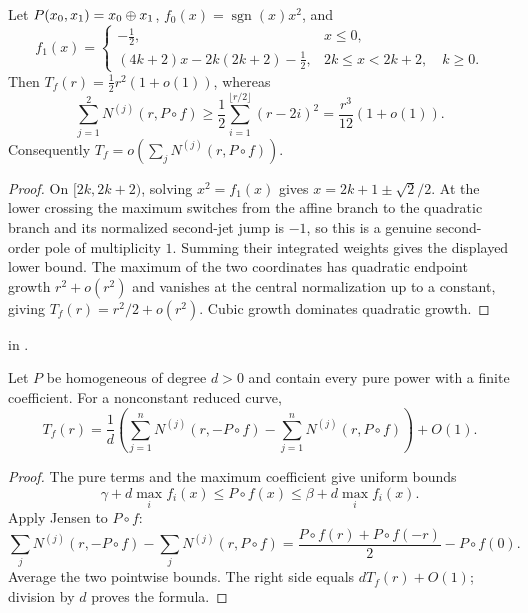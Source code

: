 \begin{example}
\leanok
{}
Let $P(x_0,x_1)=x_0\mathbin{\oplus} x_1$, $f_0(x)=\operatorname{sgn}(x)x^2$, and
\[
 f_1(x)=\begin{cases}
 -\frac12,&x\leq0,\\
 (4k+2)x-2k(2k+2)-\frac12,&2k\leq x<2k+2,\quad k\geq0.
 \end{cases}
\]
Then $T_f(r)=\frac12r^2(1+o(1))$, whereas
\[
 \sum_{j=1}^2N^{(j)}(r,P\circ f)\geq
 \frac12\sum_{i=1}^{\lfloor r/2\rfloor}(r-2i)^2
 =\frac{r^3}{12}(1+o(1)).
\]
Consequently $T_f=o(\sum_jN^{(j)}(r,P\circ f))$.
\end{example}

\begin{proof}
\leanok
On $[2k,2k+2)$, solving $x^2=f_1(x)$ gives
$x=2k+1\pm\sqrt2/2$.  At the lower crossing the maximum switches from the
affine branch to the quadratic branch and its normalized second-jet jump is
$-1$, so this is a genuine second-order pole of multiplicity $1$.  Summing
their integrated weights gives the displayed lower bound.  The maximum of
the two coordinates has quadratic endpoint growth $r^2+o(r^2)$ and vanishes
at the central normalization up to a constant, giving
$T_f(r)=r^2/2+o(r^2)$.  Cubic growth dominates quadratic growth.
\end{proof}

\begin{leanproof}
 in
.
\end{leanproof}

\begin{theorem}
\leanok
{}
Let $P$ be homogeneous of degree $d>0$ and contain every pure power with a
finite coefficient.  For a nonconstant reduced curve,
\[
 T_f(r)=\frac1d\left(
 \sum_{j=1}^nN^{(j)}(r,-P\circ f)
 -\sum_{j=1}^nN^{(j)}(r,P\circ f)\right)+O(1).
\]
\end{theorem}

\begin{proof}
\leanok
The pure terms and the maximum coefficient give uniform bounds
\[
 \gamma+d\max_i f_i(x)\leq P\circ f(x)
 \leq\beta+d\max_i f_i(x).
\]
Apply Jensen to $P\circ f$:
\[
 \sum_jN^{(j)}(r,-P\circ f)-\sum_jN^{(j)}(r,P\circ f)
 =\frac{P\circ f(r)+P\circ f(-r)}2-P\circ f(0).
\]
Average the two pointwise bounds.  The right side equals $dT_f(r)+O(1)$;
division by $d$ proves the formula.
\end{proof}

